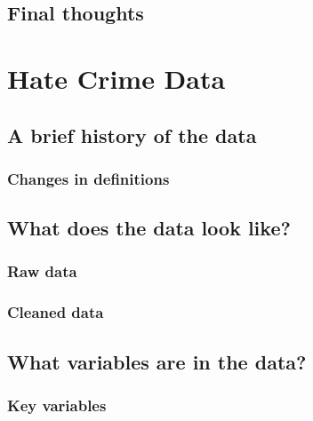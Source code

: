 \documentclass[
  12pt,
  openany]{book}
\begin{document}
\hypertarget{final-thoughts-2}{%
\section{Final thoughts}\label{final-thoughts-2}}

\hypertarget{hate_crimes}{%
\chapter{Hate Crime Data}\label{hate_crimes}}

\hypertarget{a-brief-history-of-the-data-3}{%
\section{A brief history of the data}\label{a-brief-history-of-the-data-3}}

\hypertarget{changes-in-definitions-3}{%
\subsection{Changes in definitions}\label{changes-in-definitions-3}}

\hypertarget{what-does-the-data-look-like-3}{%
\section{What does the data look like?}\label{what-does-the-data-look-like-3}}

\hypertarget{raw-data-3}{%
\subsection{Raw data}\label{raw-data-3}}

\hypertarget{cleaned-data-3}{%
\subsection{Cleaned data}\label{cleaned-data-3}}

\hypertarget{what-variables-are-in-the-data-3}{%
\section{What variables are in the data?}\label{what-variables-are-in-the-data-3}}

\hypertarget{key-variables-3}{%
\subsection{Key variables}\label{key-variables-3}}
\end{document}
